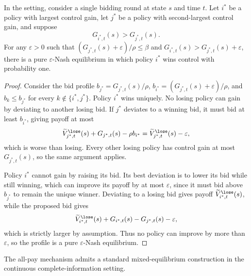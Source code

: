 \begin{theorem}
	In the \poorman setting, consider a single bidding round at state \(s\) and time \(t\).
	Let \(i^*\) be a policy with largest control gain, let \(j^*\) be a policy with second-largest control gain, and suppose
	\begin{equation}
		G_{i^*,t}(s)>G_{j^*,t}(s).
	\end{equation}
	For any \(\varepsilon>0\) such that \((G_{j^*,t}(s)+\varepsilon)/\rho\leq \beta\) and \(G_{i^*,t}(s)>G_{j^*,t}(s)+\varepsilon\), there is a pure \(\varepsilon\)-Nash equilibrium in which policy \(i^*\) wins control with probability one.
\end{theorem}

\begin{proof}
	Consider the bid profile \(b_{j^*}=G_{j^*,t}(s)/\rho\), \(b_{i^*}=(G_{j^*,t}(s)+\varepsilon)/\rho\), and \(b_k\leq b_{j^*}\) for every \(k\notin\{i^*,j^*\}\).
	Policy \(i^*\) wins uniquely.
	No losing policy can gain by deviating to another losing bid.
	If \(j^*\) deviates to a winning bid, it must bid at least \(b_{i^*}\), giving payoff at most
	\begin{equation}
		\widetilde V^{\lose}_{j^*,t}(s)+G_{j^*,t}(s)-\rho b_{i^*}
		=
		\widetilde V^{\lose}_{j^*,t}(s)-\varepsilon,
	\end{equation}
	which is worse than losing.
	Every other losing policy has control gain at most \(G_{j^*,t}(s)\), so the same argument applies.
	
	Policy \(i^*\) cannot gain by raising its bid.
	Its best deviation is to lower its bid while still winning, which can improve its payoff by at most \(\varepsilon\), since it must bid above \(b_{j^*}\) to remain the unique winner.
	Deviating to a losing bid gives payoff \(\widetilde V^{\lose}_{i^*,t}(s)\), while the proposed bid gives
	\begin{equation}
		\widetilde V^{\lose}_{i^*,t}(s)+G_{i^*,t}(s)-G_{j^*,t}(s)-\varepsilon,
	\end{equation}
	which is strictly larger by assumption.
	Thus no policy can improve by more than \(\varepsilon\), so the profile is a pure \(\varepsilon\)-Nash equilibrium.
\end{proof}

The all-pay mechanism admits a standard mixed-equilibrium construction in the continuous complete-information setting.

